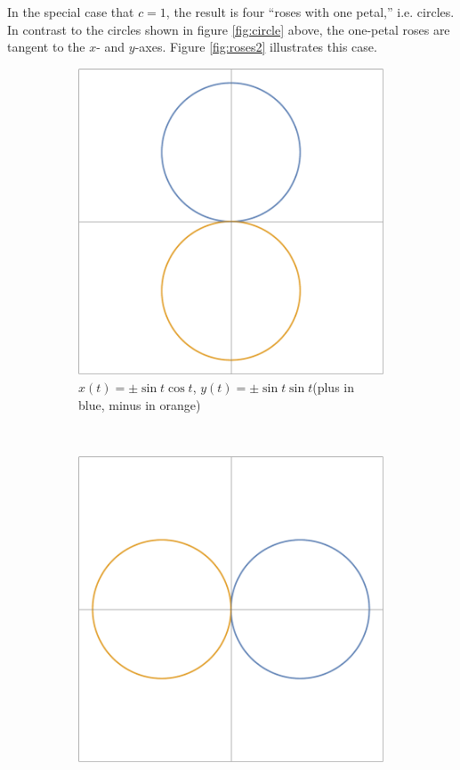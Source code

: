 \documentclass[12pt]{article}
\begin{document}
	In the special case that $c=1$, the result is four ``roses with one petal,'' i.e. circles. In contrast to the circles shown in figure \ref{fig:circle} above, the one-petal roses are tangent to the $x$- and $y$-axes. Figure \ref{fig:roses2} illustrates this case.
	\begin{figure}[h!]
		\centering
		\begin{subfigure}[t]{0.5\textwidth}
			\centering
			\includegraphics[scale=0.5125]{7_Roses4}
			\caption{$x(t)=\pm\sin{t}\cos{t}$, $y(t)=\pm\sin{t}\sin{t}$\newline(plus in blue, minus in orange)}
			\label{subfig:roses3}
		\end{subfigure}%
		~ 
		\begin{subfigure}[t]{0.5\textwidth}
			\centering
			\includegraphics[scale=0.5125]{7_Roses5}

\end{subfigure}
\end{figure}
\end{document}

